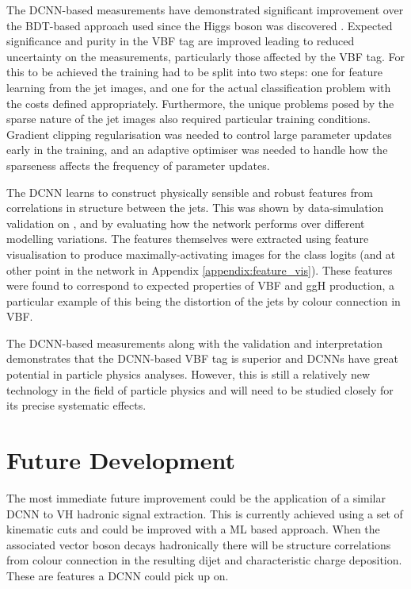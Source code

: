 The DCNN-based measurements have demonstrated significant improvement over the BDT-based approach \cite{HIG-16-040} used since the Higgs boson was discovered \cite{CMS_Higgs_disc}.
Expected significance and purity in the VBF tag are improved leading to reduced uncertainty on the measurements, particularly those affected by the VBF tag. 
For this to be achieved the training had to be split into two steps: one for feature learning from the jet images, and one for the actual classification problem with the costs defined appropriately.
Furthermore, the unique problems posed by the sparse nature of the jet images also required particular training conditions. 
Gradient clipping regularisation was needed to control large parameter updates early in the training, and an adaptive optimiser was needed to handle how the sparseness affects the frequency of parameter updates.

The DCNN learns to construct physically sensible and robust features from correlations in structure between the jets.
This was shown by data-simulation validation on \Zee, and by evaluating how the network performs over different modelling variations. 
The features themselves were extracted using feature visualisation to produce maximally-activating images for the class logits (and at other point in the network in Appendix \ref{appendix:feature_vis}). 
These features were found to correspond to expected properties of VBF and ggH production, a particular example of this being the distortion of the jets by colour connection in VBF.

The DCNN-based measurements along with the validation and interpretation demonstrates that the DCNN-based VBF tag is superior and DCNNs have great potential in particle physics analyses.
However, this is still a relatively new technology in the field of particle physics and will need to be studied closely for its precise systematic effects.




\section{Future Development}
The most immediate future improvement could be the application of a similar DCNN to VH hadronic signal extraction.
This is currently achieved using a set of kinematic cuts and could be improved with a ML based approach.
When the associated vector boson decays hadronically there will be structure correlations from colour connection in the resulting dijet and characteristic charge deposition.
These are features a DCNN could pick up on.

